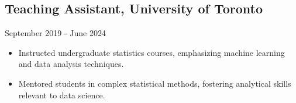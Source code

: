 \subsection{Teaching Assistant, University of Toronto}{September 2019 - June 2024}
\begin{itemize}[leftmargin=*]
\item Instructed undergraduate statistics courses, emphasizing machine learning and data analysis techniques.
\item Mentored students in complex statistical methods, fostering analytical skills relevant to data science.
\end{itemize}
